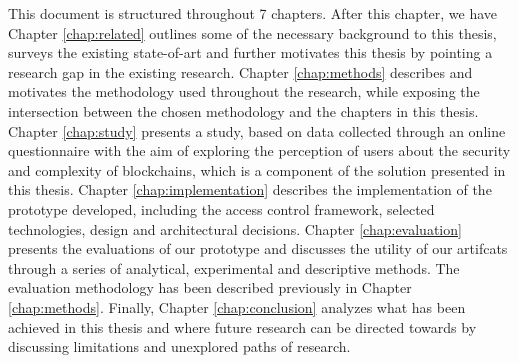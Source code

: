 This document is structured throughout 7 chapters. After this chapter, we have Chapter \ref{chap:related} outlines some of the necessary background to this thesis, surveys the existing state-of-art and further motivates this thesis by pointing a research gap in the existing research. Chapter \ref{chap:methods} describes and motivates the methodology used throughout the research, while exposing the intersection between the chosen methodology and the chapters in this thesis. Chapter \ref{chap:study} presents a study, based on data collected through an online questionnaire with the aim of exploring the perception of users about the security and complexity of blockchains, which is a component of the solution presented in this thesis. Chapter \ref{chap:implementation} describes the implementation of the prototype developed, including the access control framework, selected technologies, design and architectural decisions. Chapter \ref{chap:evaluation} presents the evaluations of our prototype and discusses the utility of our artifcats through a series of analytical, experimental and descriptive methods. The evaluation methodology has been described previously in Chapter \ref{chap:methods}. Finally, Chapter \ref{chap:conclusion} analyzes what has been achieved in this thesis and where future research can be directed towards by discussing limitations and unexplored paths of research.

